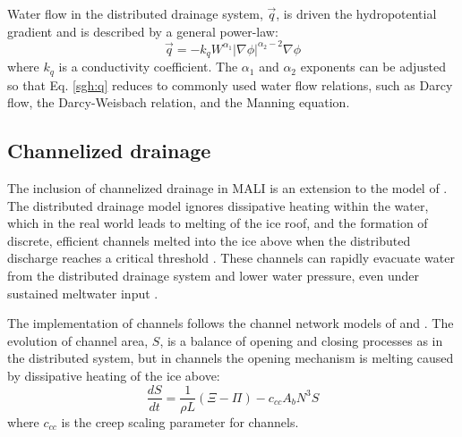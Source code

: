 Water flow in the distributed drainage system, $\vec{q}$, is driven the hydropotential gradient and is described by a general power-law:
\begin{equation}
   \vec{q} = -k_q W^{\alpha_1} |\nabla \phi|^{\alpha_2-2} \nabla \phi 
\label{sgh:q}
\end{equation}
where $k_q$ is a conductivity coefficient. 
The $\alpha_1$ and $\alpha_2$ exponents can be adjusted so that Eq. \ref{sgh:q} reduces to 
commonly used water flow relations, such as Darcy flow, the Darcy-Weisbach relation, and the Manning equation.

\subsection{Channelized drainage}
The inclusion of channelized drainage in MALI is an extension to the model of \citet{Bueler2015}.
The distributed drainage model ignores dissipative heating within the water,
which in the real world leads to melting of the ice roof, and the formation of discrete, efficient
channels melted into the ice above when the distributed discharge reaches a critical threshold \citep{Schoof2010a, Hewitt2011, Werder2013, Flowers2015}.
These channels can rapidly evacuate water from the distributed drainage system and 
lower water pressure, even under sustained meltwater input \citep{Schoof2010a, Hewitt2011, Werder2013, Hoffman2014, Flowers2015}.

The implementation of channels follows the channel network models of \citet{Werder2013} and \citet{Hewitt2013}.
The evolution of channel area, $S$, is a balance of opening and closing processes 
as in the distributed system, but in channels the opening mechanism is 
melting caused by dissipative heating of the ice above:
\begin{equation}
   \frac{dS}{dt} = \frac{1}{\rho L} ( \Xi - \Pi ) - c_{cc} A_b N^3 S
\label{sgh:channelevol}
\end{equation}
where $c_{cc}$ is the creep scaling parameter for channels.

